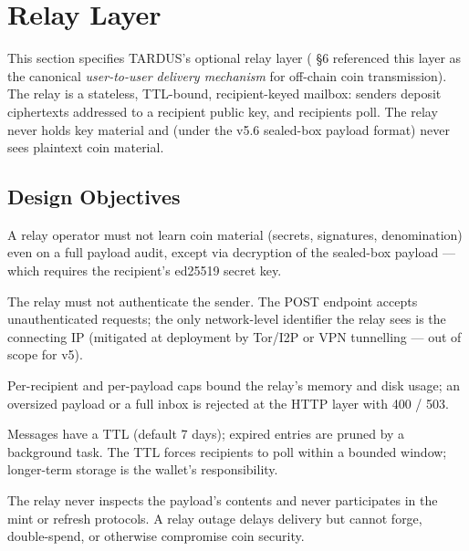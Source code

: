 \section{Relay Layer}
\label{sec:relay}

This section specifies TARDUS's optional relay layer ( §6
referenced this layer as the canonical \emph{user-to-user delivery
mechanism} for off-chain coin transmission). The relay is a stateless,
TTL-bound, recipient-keyed mailbox: senders deposit ciphertexts addressed
to a recipient public key, and recipients poll. The relay never holds
key material and (under the v5.6 sealed-box payload format) never sees
plaintext coin material.

\subsection{Design Objectives}
\label{sec:relay-objectives}

\begin{description}[leftmargin=2em,style=nextline,itemsep=0pt]
  \item[O1 (recipient confidentiality)] A relay operator must not learn
    coin material (secrets, signatures, denomination) even on a full
    payload audit, except via decryption of the sealed-box payload —
    which requires the recipient's ed25519 secret key.
  \item[O2 (sender anonymity)] The relay must not authenticate the
    sender. The POST endpoint accepts unauthenticated requests; the
    only network-level identifier the relay sees is the connecting IP
    (mitigated at deployment by Tor/I2P or VPN tunnelling — out of
    scope for v5).
  \item[O3 (bounded resources)] Per-recipient and per-payload caps
    bound the relay's memory and disk usage; an oversized payload or
    a full inbox is rejected at the HTTP layer with 400 / 503.
  \item[O4 (eventual delivery)] Messages have a TTL (default 7 days);
    expired entries are pruned by a background task. The TTL forces
    recipients to poll within a bounded window; longer-term storage is
    the wallet's responsibility.
  \item[O5 (operator agnosticism)] The relay never inspects the
    payload's contents and never participates in the mint or refresh
    protocols. A relay outage delays delivery but cannot forge,
    double-spend, or otherwise compromise coin security.
\end{description}

